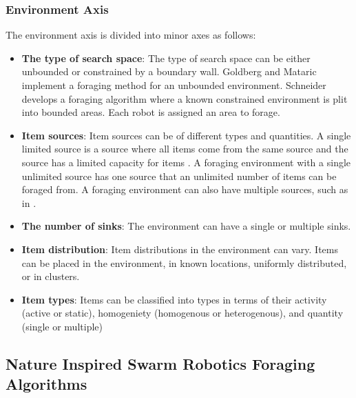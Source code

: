 \subsubsection{Environment Axis}
\label{environmentaxis}
The environment axis is divided into minor axes as follows:
\begin{itemize}
\item \textbf{The type of search space}: The type of search space can be either unbounded or constrained by a boundary wall. Goldberg and Mataric \cite{Goldberg01designand} implement a foraging method for an unbounded environment. Schneider \cite{schneider1998territorial} develops a foraging algorithm where a known constrained environment is plit into bounded areas. Each robot is assigned an area to forage.

\item \textbf{Item sources}: Item sources can be of different types and quantities. A single limited source is a source where all items come from the same source and the source has a limited capacity for items \cite{sugawara2002swarming}. A foraging environment with a single unlimited source has one source that an unlimited number of items can be foraged from. A foraging environment can also have multiple sources, such as in \cite{Goldberg01designand}. 

\item \textbf{The number of sinks}: The environment can have a single or multiple sinks. 

\item \textbf{Item distribution}: Item distributions in the environment can vary. Items can be placed  in the environment, in known locations, uniformly distributed, or in clusters.

\item \textbf{Item types}: Items can be classified into types in terms of their activity (active or static), homogeniety (homogenous or heterogenous), and quantity (single or multiple) \cite{Balch99rewardand,
 campo2007efficient, jones2003adaptive}

\end{itemize}



\subsection{Nature Inspired Swarm Robotics Foraging Algorithms}

